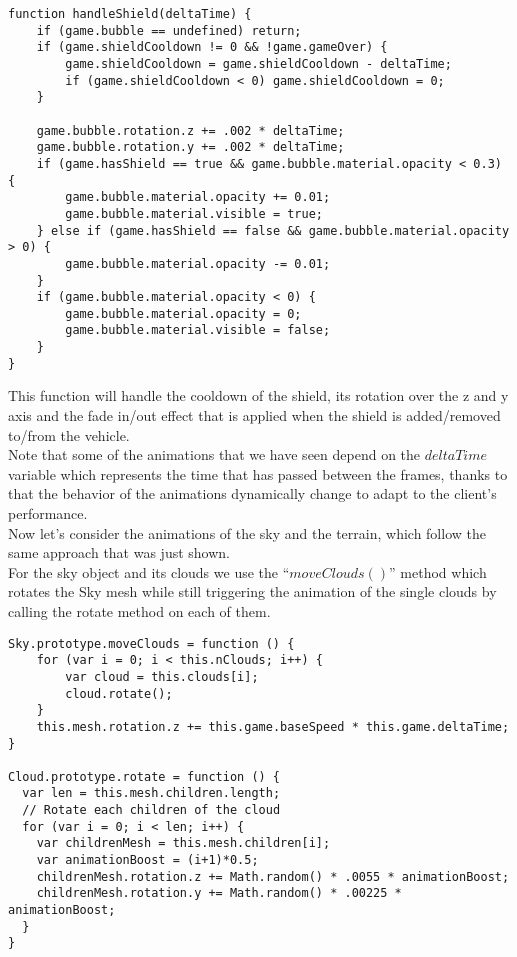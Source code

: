 \documentclass[a4paper,11pt]{article}
\begin{document}
\begin{verbatim}
function handleShield(deltaTime) {
    if (game.bubble == undefined) return;
    if (game.shieldCooldown != 0 && !game.gameOver) {
        game.shieldCooldown = game.shieldCooldown - deltaTime;
        if (game.shieldCooldown < 0) game.shieldCooldown = 0;
    }

    game.bubble.rotation.z += .002 * deltaTime;
    game.bubble.rotation.y += .002 * deltaTime;
    if (game.hasShield == true && game.bubble.material.opacity < 0.3) {
        game.bubble.material.opacity += 0.01;
        game.bubble.material.visible = true;
    } else if (game.hasShield == false && game.bubble.material.opacity > 0) {
        game.bubble.material.opacity -= 0.01;
    }
    if (game.bubble.material.opacity < 0) {
        game.bubble.material.opacity = 0;
        game.bubble.material.visible = false;
    }
}
\end{verbatim}
This function will handle the cooldown of the shield, its rotation over the z and y axis and the fade in/out effect that is applied when the shield is added/removed to/from the vehicle.\\
Note that some of the animations that we have seen depend on the $deltaTime$ variable which represents the time that has passed between the frames, thanks to that the behavior of the animations dynamically change to adapt to the client's performance.\\
Now let's consider the animations of the sky and the terrain, which follow the same approach that was just shown.\\
For the sky object and its clouds we use the  ``$moveClouds()$'' method which rotates the Sky mesh while still triggering the animation of the single clouds by calling the rotate method on each of them.
\begin{verbatim}
Sky.prototype.moveClouds = function () {
    for (var i = 0; i < this.nClouds; i++) {
        var cloud = this.clouds[i];
        cloud.rotate();
    }
    this.mesh.rotation.z += this.game.baseSpeed * this.game.deltaTime;
}

Cloud.prototype.rotate = function () {
  var len = this.mesh.children.length;
  // Rotate each children of the cloud
  for (var i = 0; i < len; i++) {
    var childrenMesh = this.mesh.children[i];
    var animationBoost = (i+1)*0.5;
    childrenMesh.rotation.z += Math.random() * .0055 * animationBoost;
    childrenMesh.rotation.y += Math.random() * .00225 * animationBoost;
  }
}

\end{verbatim}{}
\end{document}
